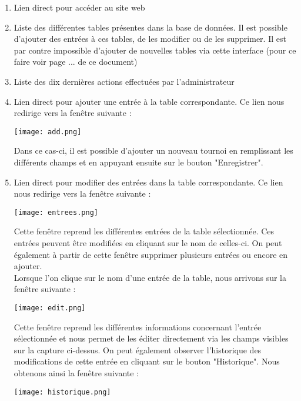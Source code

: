 \begin{enumerate}
\item Lien direct pour accéder au site web
\item Liste des différentes tables présentes dans la base de données. Il est possible d’ajouter des entrées à ces tables, de les modifier ou de les supprimer. Il est par contre impossible d’ajouter de nouvelles tables via cette interface (pour ce faire voir page ... de ce document)
\item Liste des dix dernières actions effectuées par l’administrateur
\item Lien direct pour ajouter une entrée à la table correspondante. Ce lien nous redirige vers la fenêtre suivante :

\begin{center}
\texttt{[image: add.png]}
\end{center}

Dans ce cas-ci, il est possible d'ajouter un nouveau tournoi en remplissant les différents champs et en appuyant ensuite sur le bouton "Enregistrer".

\item Lien direct pour modifier des entrées dans la table correspondante. Ce lien nous redirige vers la fenêtre suivante :

\begin{center}
\texttt{[image: entrees.png]}
\end{center}

Cette fenêtre reprend les différentes entrées de la table sélectionnée. Ces entrées peuvent être modifiées en cliquant sur le nom de celles-ci. On peut également à partir de cette fenêtre supprimer plusieurs entrées ou encore en ajouter.\\

Lorsque l’on clique sur le nom d’une entrée de la table, nous arrivons sur la fenêtre suivante :

\begin{center}
\texttt{[image: edit.png]}
\end{center}

Cette fenêtre reprend les différentes informations concernant l’entrée sélectionnée et nous permet de les éditer directement via les champs visibles sur la capture ci-dessus. On peut également observer l’historique des modifications de cette entrée en cliquant sur le bouton "Historique". Nous obtenons ainsi la fenêtre suivante :

\begin{center}
\texttt{[image: historique.png]}
\end{center}
\end{enumerate}